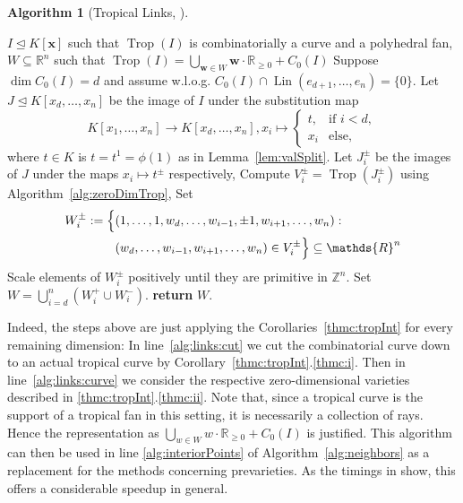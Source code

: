 \documentclass[
  paper=a4,
  titlepage,
  bibliography=totoc,
  listof=totoc,
  pagesize=pdftex
]{scrartcl}
\numberwithin{figure}{section}
\numberwithin{equation}{section}
\numberwithin{table}{section}
\newcommand*\setZ{\mathds{Z}}
\newcommand*\setR{\mathds{R}}
\let\vec\mathbf
\let\idealof\trianglelefteq
\DeclareMathOperator{\Trop}{Trop}
\DeclareMathOperator{\Lin}{Lin}
\theoremstyle{definition}
\newtheorem{algo}[definition]{Algorithm}
\numberwithin{definition}{section}
\begin{document}
\begin{algo}[Tropical Links, {\cite[Algorithm~4.5]{tropPointsLinks}}]\
  \label{alg:tropLinks}
  \begin{algorithmic}[1]
    \Require $I \idealof K[\vec x]$ such that $\Trop(I)$ is combinatorially a curve and a
    polyhedral fan,
    \Ensure $W \subseteq \setR^n$ such that $\Trop(I) = \bigcup_{\vec w \in W} \vec w
      \cdot \setR_{\geq0} + C_0(I)$
    \State Suppose $\dim C_0(I) = d$ and assume w.l.o.g. $C_0(I) \cap \Lin(e_{d+1}, \dots,
      e_n) = \{0\}$.
    \State Let $J \idealof K[x_d, \dots, x_n]$ be the image of $I$ under the substitution
      map
      \[
        K[x_1, \dots, x_n] \to K[x_d, \dots, x_n], x_i \mapsto
        \begin{cases}
          t, & \text{if } i < d, \\
          x_i & \text{else},
        \end{cases}
      \]
      where $t \in K$ is $t = t^1 = \phi(1)$ as in Lemma~\ref{lem:valSplit}.
      \label{alg:links:cut}
      \State Let $J_i^\pm$ be the images of $J$ under the maps $x_i \mapsto t^\pm$
        respectively,
        \label{alg:links:curve}
      \State Compute $V_i^\pm = \Trop(J_i^\pm)$ using Algorithm~\ref{alg:zeroDimTrop},
      \State Set
        \begin{align*}
          W_i^\pm := \Bigl\{
            &(1, \dots, 1, w_d, \dots, w_{i-1}, \pm1, w_{i+1}, \dots, w_n) : \\
            &(w_d, \dots, w_{i-1}, w_{i+1}, \dots, w_n) \in V_i^\pm
          \Bigr\} \subseteq \setR^n
        \end{align*}
      \State Scale elements of $W_i^\pm$ positively until they are primitive in $\setZ^n$.
    \EndFor
    \State Set $W = \bigcup_{i=d}^n (W_i^+ \cup W_i^-)$.
    \State\textbf{return} $W$.
  \end{algorithmic}
\end{algo}

Indeed, the steps above are just applying the Corollaries~\ref{thmc:tropInt} for every
remaining dimension: In line~\ref{alg:links:cut} we cut the combinatorial curve down to an
actual tropical curve by Corollary~\ref{thmc:tropInt}.\ref{thmc:i}. Then in
line~\ref{alg:links:curve} we consider the respective zero-dimensional varieties described
in \ref{thmc:tropInt}.\ref{thmc:ii}. Note that, since a tropical curve is the support
of a tropical fan in this setting, it is necessarily a collection of rays. Hence the
representation as $\bigcup_{w \in W} w\cdot \setR_{\geq0} + C_0(I)$ is justified. This
algorithm can then be used in line \ref{alg:interiorPoints} of
Algorithm~\ref{alg:neighbors} as a replacement for the methods concerning prevarieties. As
the timings in \cite{tropPointsLinks} show, this offers a considerable speedup in general.
\end{document}
